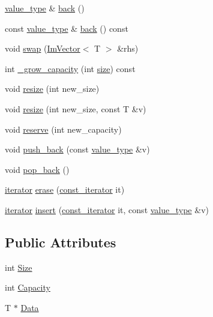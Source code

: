 \begin{DoxyCompactItemize}
\item 
\hyperlink{class_im_vector_a8bd77e4e7581d8e5f9e98d7c2f3c2a80}{value\+\_\+type} \& \hyperlink{class_im_vector_a3e4424d3fca190894598a6575f9d2401}{back} ()
\item 
const \hyperlink{class_im_vector_a8bd77e4e7581d8e5f9e98d7c2f3c2a80}{value\+\_\+type} \& \hyperlink{class_im_vector_a6f22918d4f139a1c4c3410ccae726f81}{back} () const
\item 
void \hyperlink{class_im_vector_afcec0d2a1e28aebe412b6efd06f0a77a}{swap} (\hyperlink{class_im_vector}{Im\+Vector}$<$ T $>$ \&rhs)
\item 
int \hyperlink{class_im_vector_af9dfc79dfd89c904830bebc492a18310}{\+\_\+grow\+\_\+capacity} (int \hyperlink{class_im_vector_a8c903ecb1aaee0601b6a8ad835a4a435}{size}) const
\item 
void \hyperlink{class_im_vector_ac371dd62e56ae486b1a5038cf07eee56}{resize} (int new\+\_\+size)
\item 
void \hyperlink{class_im_vector_abe7f21776ecfb7d0214963fd8c0689f0}{resize} (int new\+\_\+size, const T \&v)
\item 
void \hyperlink{class_im_vector_a0f14f5736c3372157856eebb67123b75}{reserve} (int new\+\_\+capacity)
\item 
void \hyperlink{class_im_vector_a68387993f2a5f5c3b2a7139d9ab778b8}{push\+\_\+back} (const \hyperlink{class_im_vector_a8bd77e4e7581d8e5f9e98d7c2f3c2a80}{value\+\_\+type} \&v)
\item 
void \hyperlink{class_im_vector_a3db7ce62d3c429effdb893fbf7148c1c}{pop\+\_\+back} ()
\item 
\hyperlink{class_im_vector_a74b5478f1f6fd471cc71219bce483db6}{iterator} \hyperlink{class_im_vector_a1e1fd9b678be9d4b4432fbefde976045}{erase} (\hyperlink{class_im_vector_aedeac9c5080f9d6ce96ae837768ee4c4}{const\+\_\+iterator} it)
\item 
\hyperlink{class_im_vector_a74b5478f1f6fd471cc71219bce483db6}{iterator} \hyperlink{class_im_vector_a52fdb731c13c82a1fd971186c6a701b5}{insert} (\hyperlink{class_im_vector_aedeac9c5080f9d6ce96ae837768ee4c4}{const\+\_\+iterator} it, const \hyperlink{class_im_vector_a8bd77e4e7581d8e5f9e98d7c2f3c2a80}{value\+\_\+type} \&v)
\end{DoxyCompactItemize}
\subsection*{Public Attributes}
\begin{DoxyCompactItemize}
\item 
int \hyperlink{class_im_vector_abbfd157947f66280d27b21d70a16df8d}{Size}
\item 
int \hyperlink{class_im_vector_abd24482b4d30d22e37582e521e5bfb33}{Capacity}
\item 
T $\ast$ \hyperlink{class_im_vector_ac0e46e8b30cb079d93c8f0aad7d7cbd0}{Data}
\end{DoxyCompactItemize}


